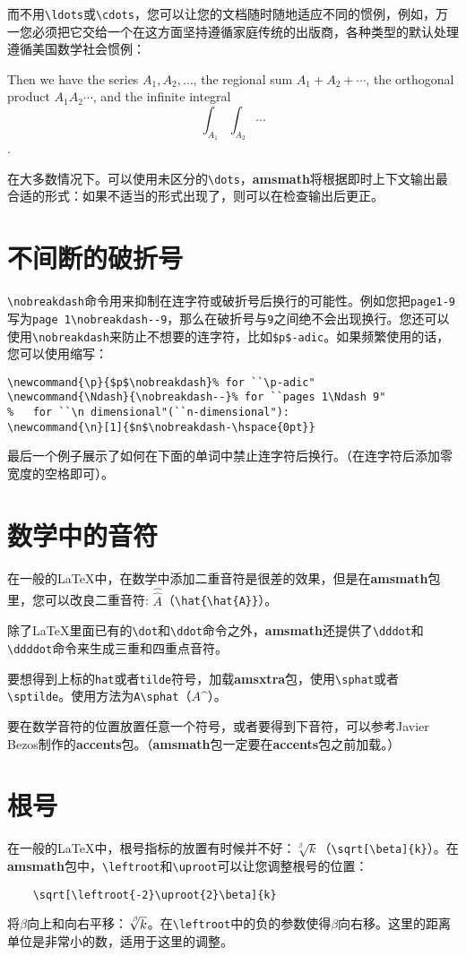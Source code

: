 \documentclass[openany]{ctexbook}
\begin{document}
而不用\verb|\ldots|或\verb|\cdots|，您可以让您的文档随时随地适应不同的惯例，例如，万一您必须把它交给一个在这方面坚持遵循家庭传统的出版商，各种类型的默认处理遵循美国数学社会惯例：

\begin{tcblisting}{}
Then we have the series $A_1,A_2,\dotsc$,
the regional sum $A_1+A_2+\dotsb$, the
orthogonal product $A_1 A_2\dotsm$, and
the infinite integral
\[\int_{A_1}\int_{A_2}\dotsi\].
\end{tcblisting}

在大多数情况下。可以使用未区分的\verb|\dots|，{\bfseries amsmath}将根据即时上下文输出最合适的形式：如果不适当的形式出现了，则可以在检查输出后更正。
\section{不间断的破折号}
\verb|\nobreakdash|命令用来抑制在连字符或破折号后换行的可能性。例如您把\verb|page1-9|写为\verb|page 1\nobreakdash--9|，那么在破折号与\verb|9|之间绝不会出现换行。您还可以使用\verb|\nobreakdash|来防止不想要的连字符，比如\verb|$p$-adic|。如果频繁使用的话，您可以使用缩写：
\begin{verbatim}
\newcommand{\p}{$p$\nobreakdash}% for ``\p-adic"
\newcommand{\Ndash}{\nobreakdash--}% for ``pages 1\Ndash 9"
%   for ``\n dimensional"(``n-dimensional"):
\newcommand{\n}[1]{$n$\nobreakdash-\hspace{0pt}}
\end{verbatim}

最后一个例子展示了如何在下面的单词中禁止连字符后换行。（在连字符后添加零宽度的空格即可）。

\section{数学中的音符}
在一般的\LaTeX 中，在数学中添加二重音符是很差的效果，但是在{\bfseries amsmath}包里，您可以改良二重音符: $\hat{\hat{A}}$（\verb|\hat{\hat{A}}|）。

除了\LaTeX 里面已有的\verb|\dot|和\verb|\ddot|命令之外，{\bfseries amsmath}还提供了\verb|\dddot|和\verb|\ddddot|命令来生成三重和四重点音符。

要想得到上标的\verb|hat|或者\verb|tilde|符号，加载{\bfseries amsxtra}包，使用\verb|\sphat|或者\verb|\sptilde|。使用方法为\verb|A\sphat|（$A\sphat$）。

要在数学音符的位置放置任意一个符号，或者要得到下音符，可以参考Javier Bezos制作的{\bfseries accents}包。（{\bfseries amsmath}包一定要在{\bfseries accents}包之前加载。）
\section{根号}
在一般的\LaTeX 中，根号指标的放置有时候并不好：$\sqrt[\beta]{k}$（\verb|\sqrt[\beta]{k}|）。在{\bfseries amsmath}包中，\verb|\leftroot|和\verb|\uproot|可以让您调整根号的位置：
\begin{verbatim}
    \sqrt[\leftroot{-2}\uproot{2}\beta]{k}
\end{verbatim}
将$\beta$向上和向右平移：$\sqrt[\leftroot{-2}\uproot{2}\beta]{k}$。在\verb|\leftroot|中的负的参数使得$\beta$向右移。这里的距离单位是非常小的数，适用于这里的调整。
\end{document}

